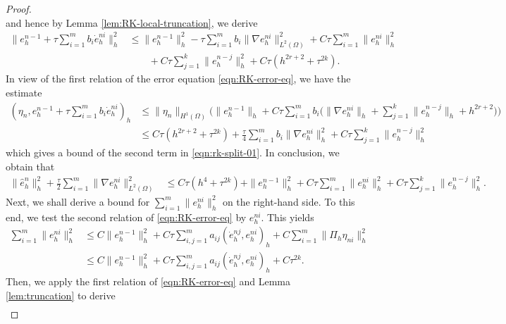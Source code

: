 \documentclass[10pt,final,leqno,onefignum,onetabnum]{siamltex}%
\def\leq{\leqslant}
\def\II{(\Omega)}
\begin{document}
\begin{proof}
\begin{equation*}
\end{equation*}
and hence by Lemma \ref{lem:RK-local-truncation}, we derive
\begin{align*}
\|e_h^{n-1}+\tau\sum_{i=1}^{m} b_i\dot{e}_h^{ni}\|_h^2
&\leq \|e_h^{n-1}\|_h^2 - \tau\sum_{i=1}^{m}b_i \| \nabla e_h^{ni}  \|_{L^2\II}^2 + C\tau \sum_{i=1}^m  \|  e_h^{ni} \|_h^2 \\
&\qquad + C\tau \sum_{j=1}^k \| e_h^{n-j} \|_h^2 + C \tau(h^{2r+2}+\tau^{2k}).
\end{align*}
In view of the first relation of the error equation \eqref{eqn:RK-error-eq}, we have the estimate
\begin{align*}
(\eta_{n}, e_h^{n-1}+ \tau\sum_{i=1}^{m} b_i\dot{e}_h^{ni})_h
&\le \| \eta_n  \|_{H^1\II} \Big( \|e_h^{n-1}\|_h + C \tau  \sum_{i=1}^m b_i
\Big(\| \nabla e_h^{ni} \|_h + \sum_{j=1}^{k} \|  e_h^{n-j} \|_h  + h^{2r+2}\Big)\Big)\\
&\le C\tau(h^{2r+2}+ \tau^{2k})   + \frac{\tau}{4}   \sum_{i=1}^{m} b_i  \| \nabla e_h^{ni} \|_h^2
+ C\tau  \sum_{j=1}^{k} \|  e_h^{n-j} \|_h^2
\end{align*}
which gives a bound of the second term in \eqref{eqn:rk-split-01}. In conclusion, we obtain that
\begin{equation}\label{eqn:rk-est-02}
\begin{split}
 \|\hat e_h^{n}\|_h^2 + \frac\tau2 \sum_{i=1}^m \| \nabla e_h^{ni} \|_{L^2\II}^2& \le  C\tau(h^4+ \tau^{2k}) +  \|e_h^{n-1}\|_h^2
 + C \tau   \sum_{i=1}^m \|  e_h^{ni} \|_h^2 + C\tau  \sum_{j=1}^{k} \|  e_h^{n-j} \|_h^2.
\end{split}
\end{equation}
Next, we shall derive a bound for  $ \sum_{i=1}^m \|  e_h^{ni} \|_h^2 $
 on the right-hand side. To this
end, we test the second relation of  \eqref{eqn:RK-error-eq} by $e_h^{ni}$. This yields
\begin{equation*}
\begin{split}
 \sum_{i=1}^m \|e_h^{ni}\|_h^2 & \le C \|  e_h^{n-1} \|_h^2 + C\tau\sum_{i,j=1}^m a_{ij}(\dot e_h^{nj},e_h^{ni})_h + C\sum_{i=1}^m \| \Pi_h \eta_{ni} \|_h^2\\
& \le  C \|  e_h^{n-1} \|_h^2 + C\tau\sum_{i,j=1}^m a_{ij}(\dot e_h^{nj},e_h^{ni}) _h + C\tau^{2k}.
\end{split}
\end{equation*}
Then, we apply the first relation of  \eqref{eqn:RK-error-eq} and Lemma \ref{lem:truncation} to derive
\begin{equation*}
\begin{split}

\end{split}
\end{equation*}
\end{proof}
\end{document}
